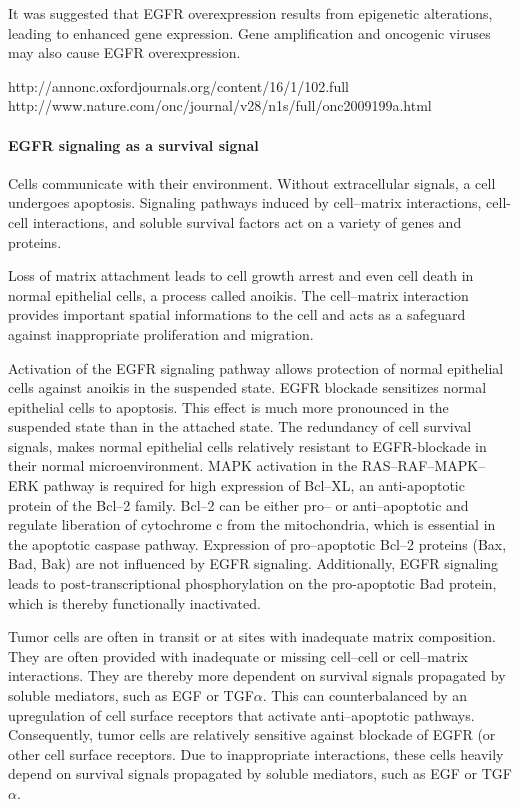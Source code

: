 {{{      It was suggested that EGFR overexpression results from epigenetic
      alterations, leading to enhanced gene expression. Gene amplification and
      oncogenic viruses may also cause EGFR overexpression.

      http://annonc.oxfordjournals.org/content/16/1/102.full
      http://www.nature.com/onc/journal/v28/n1s/full/onc2009199a.html

      \paragraph{EGFR signaling as a survival signal}

        Cells communicate with their environment. Without extracellular signals,
        a cell undergoes apoptosis. Signaling pathways induced by cell--matrix
        interactions, cell-cell interactions, and soluble survival factors act
        on a variety of genes and proteins.

        Loss of matrix attachment leads to cell growth arrest and even cell
        death in normal epithelial cells, a process called anoikis. The
        cell--matrix interaction provides important spatial informations to the
        cell and acts as a safeguard against inappropriate proliferation and
        migration.

        Activation of the EGFR signaling pathway allows protection of normal
        epithelial cells against anoikis in the suspended state. EGFR blockade
        sensitizes normal epithelial cells to apoptosis. This effect is much
        more pronounced in the suspended state than in the attached state. The
        redundancy of cell survival signals, makes normal epithelial cells
        relatively resistant to EGFR-blockade in their normal microenvironment.
        MAPK activation in the RAS--RAF--MAPK--ERK pathway is required for high
        expression of Bcl--XL, an anti-apoptotic protein of the Bcl--2 family.
        Bcl--2 can be either pro-- or anti--apoptotic and regulate liberation of
        cytochrome c from the mitochondria, which is essential in the apoptotic
        caspase pathway. Expression of pro--apoptotic Bcl--2 proteins (Bax, Bad,
        Bak) are not influenced by EGFR signaling. Additionally, EGFR signaling
        leads to post-transcriptional phosphorylation on the pro-apoptotic Bad
        protein, which is thereby functionally inactivated.

        Tumor cells are often in transit or at sites with inadequate matrix
        composition. They are often provided with inadequate or missing
        cell--cell or cell--matrix interactions. They are thereby more dependent
        on survival signals propagated by soluble mediators, such as EGF or
        TGF$\alpha$. This can counterbalanced by an upregulation of cell surface
        receptors that activate anti--apoptotic pathways. Consequently, tumor
        cells are relatively sensitive against blockade of EGFR (or other cell
        surface receptors. Due to inappropriate interactions, these cells
        heavily depend on survival signals propagated by soluble mediators,
        such as EGF or TGF$\alpha$.

}}}
